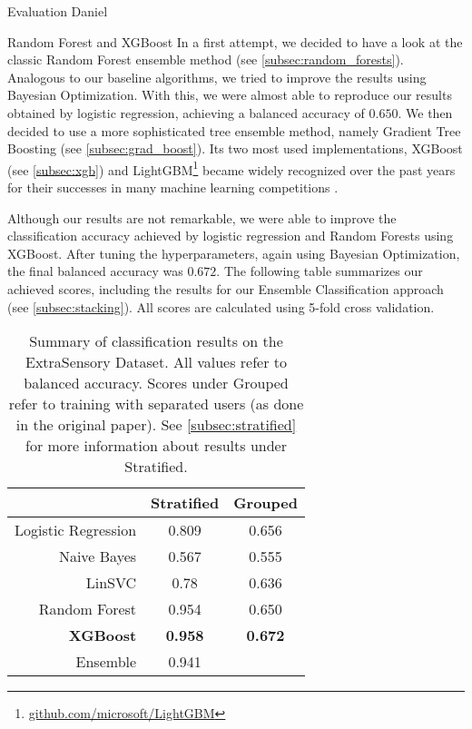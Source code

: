 \begin{section}{Evaluation Daniel}
	\begin{subsection}{Random Forest and XGBoost}
		In a first attempt, we decided to have a look at the classic Random Forest ensemble method (see \ref{subsec:random_forests}). Analogous to our baseline algorithms, we tried to improve the results using Bayesian Optimization. With this, we were almost able to reproduce our results obtained by logistic regression, achieving a balanced accuracy of $0.650$. We then decided to use a more sophisticated tree ensemble method, namely Gradient Tree Boosting (see \ref{subsec:grad_boost}). Its two most used implementations, XGBoost (see \ref{subsec:xgb}) and LightGBM\footnote{\href{https://github.com/microsoft/LightGBM}{github.com/microsoft/LightGBM}} became widely recognized over the past years for their successes in many machine learning competitions \cite{Chen16}. \par
		Although our results are not remarkable, we were able to improve the classification accuracy achieved by logistic regression and Random Forests using XGBoost. After tuning the hyperparameters, again using Bayesian Optimization, the final balanced accuracy was $0.672$.  The following table summarizes our achieved scores, including the results for our Ensemble Classification approach (see \ref{subsec:stacking}). All scores are calculated using 5-fold cross validation.
		\begin{table}[H]
			\begin{center} 
				\begin{tabular}{r|c|c}
					\toprule
					& Stratified & Grouped \\
					\midrule
					Logistic Regression & 0.809 & 0.656 \\
					Naive Bayes & 0.567 & 0.555 \\
					LinSVC & 0.78 & 0.636 \\
					Random Forest & 0.954 & 0.650 \\
					\textbf{XGBoost} & \textbf{0.958} & \textbf{0.672} \\
					\midrule
					Ensemble & 0.941 & \\
					\bottomrule
				\end{tabular}
			\end{center}
			\caption{Summary of classification results on the ExtraSensory Dataset. All values refer to balanced accuracy. Scores under \glqq Grouped\grqq{} refer to training with separated users (as done in the original paper). See \ref{subsec:stratified} for more information about results under \glqq Stratified\grqq.}
			\label{table:results}
		\end{table}
	\end{subsection}


\end{section}
